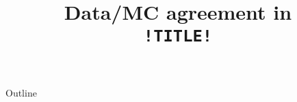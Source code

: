 \documentclass{beamer}
\title{Data/MC agreement in \\ \texttt{!TITLE!}}
\begin{document}
\begin{frame}
\titlepage
\end{frame}

\begin{frame}{Outline}
\tableofcontents
\end{frame}
\end{document}
